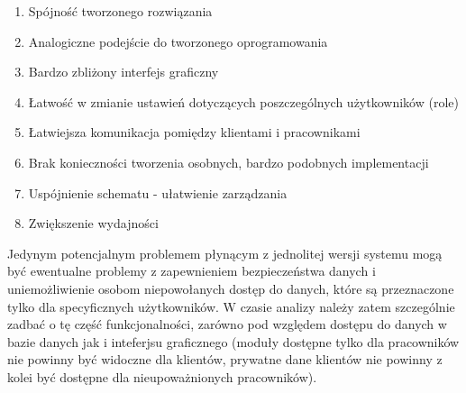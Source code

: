 \begin{enumerate}
	\item Spójność tworzonego rozwiązania
	\item Analogiczne podejście do tworzonego oprogramowania
	\item Bardzo zbliżony interfejs graficzny
	\item Łatwość w zmianie ustawień dotyczących poszczególnych użytkowników (role)
	\item Łatwiejsza komunikacja pomiędzy klientami i pracownikami
	\item Brak konieczności tworzenia osobnych, bardzo podobnych implementacji
	\item Uspójnienie schematu - ułatwienie zarządzania
	\item Zwiększenie wydajności
\end{enumerate}

Jedynym potencjalnym problemem płynącym z jednolitej wersji systemu mogą być
ewentualne problemy z zapewnieniem bezpieczeństwa danych i uniemożliwienie
osobom niepowołanych dostęp do danych, które są przeznaczone tylko dla
specyficznych użytkowników. W czasie analizy należy zatem szczególnie zadbać o
tę część funkcjonalności, zarówno pod względem dostępu do danych w bazie danych
jak i inteferjsu graficznego (moduły dostępne tylko dla pracowników nie powinny
być widoczne dla klientów, prywatne dane klientów nie powinny z kolei być
dostępne dla nieupoważnionych pracowników).

